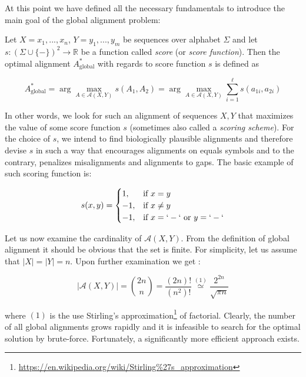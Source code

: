 At this point we have defined all the necessary fundamentals to introduce the main goal of the global alignment problem:

\begin{definition}
Let $X = x_1,...,x_n$, $Y = y_1, ..., y_m$ be sequences over alphabet $\Sigma$ and let $s: (\Sigma \cup \{-\})^2 \to \mathbb{R}$ be a function called \textit{score} (or \textit{score function}). Then the optimal alignment $A_{\text{global}}^{\ast}$ with regards to score function $s$ is defined as

\begin{equation}
    A_{\text{global}}^{\ast} = \arg \max_{A \in \mathcal{A}(X,Y)} s(A_{1}, A_{2}) = \arg \max_{A \in \mathcal{A}(X,Y)} \sum_{i=1}^{\ell} s(a_{1i}, a_{2i})
\end{equation}
\end{definition}

In other words, we look for such an alignment of sequences $X, Y$ that maximizes the value of some score function $s$ (sometimes also called a \textit{scoring scheme}). For the choice of $s$, we intend to find biologically plausible alignments and therefore devise $s$ in such a way that encourages alignments on equals symbols and to the contrary, penalizes misalignments and alignments to gaps. The basic example of such scoring function is:

\begin{equation}
s(x, y) =
\begin{cases} 
    1, & \text{if } x = y\\
    -1, & \text{if } x \neq y\\
    -1, & \text{if } x = `-` \text{ or } y = `-`
\end{cases}
\label{basic_score}
\end{equation}

Let us now examine the cardinality of $\mathcal{A}(X,Y)$. From the definition of global alignment it should be obvious that the set is finite. For simplicity, let us assume that $|X| = |Y| = n$. Upon further examination we get \cite{Durbin1998}:

\begin{equation}
    |\mathcal{A}(X,Y)| = \binom{2n}{n} = \frac{(2n)!}{(n^2)!} \overset{(1)}{\simeq} \frac{2^{2n}}{\sqrt{\pi n}}
\end{equation}

where $(1)$ is the use Stirling's approximation\footnote{\url{https://en.wikipedia.org/wiki/Stirling\%27s_approximation}} of factorial. Clearly, the number of all global alignments grows rapidly and it is infeasible to search for the optimal solution by brute-force. Fortunately, a significantly more efficient approach exists.

